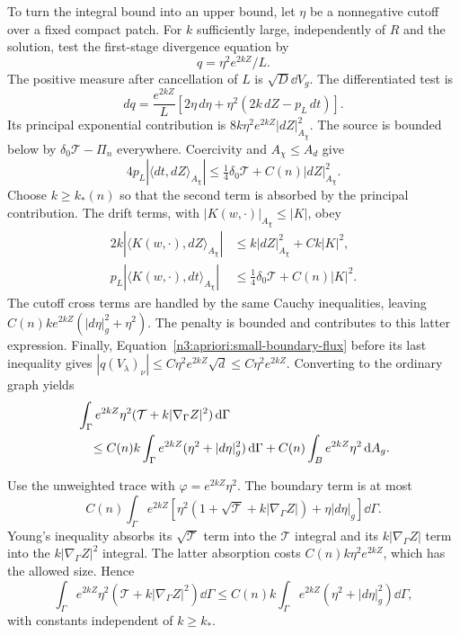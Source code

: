 To turn the integral bound into an upper bound, let $\eta$ be a
nonnegative cutoff over a fixed compact patch.  For $k$ sufficiently
large, independently of $R$ and the solution, test the first-stage
divergence equation by
\[
 q=\eta^2e^{2kZ}/L.
\]
The positive measure after cancellation of $L$ is
$\sqrt D\dd V_g$.  The differentiated test is
\[
 dq=\frac{e^{2kZ}}L
       [2\eta\,d\eta+\eta^2(2k\,dZ-p_L\,dt)].
\]
Its principal exponential contribution is
$8k\eta^2e^{2kZ}|dZ|_{A_\chi}^2$.  The source is bounded below
by $\delta_0\mathcal T-\Pi_n$ everywhere.
Coercivity and $A_\chi\le A_d$ give
\[
 4p_L|\langle dt,dZ\rangle_{A_\chi}|
 \le\tfrac14\delta_0\mathcal T+C(n)|dZ|_{A_\chi}^2.
\]
Choose $k\ge k_*(n)$ so that the second term is absorbed by the
principal contribution.  The drift terms, with $|K(w,\cdot)|_{A_\chi}
\le |K|$, obey
\begin{align*}
 2k|\langle K(w,\cdot),dZ\rangle_{A_\chi}|
   &\le k|dZ|_{A_\chi}^2+Ck|K|^2,\\
 p_L|\langle K(w,\cdot),dt\rangle_{A_\chi}|
   &\le\tfrac14\delta_0\mathcal T+C(n)|K|^2.
\end{align*}
The cutoff cross terms are handled by the same Cauchy inequalities,
leaving $C(n)k e^{2kZ}(|d\eta|_g^2+\eta^2)$.
The penalty is bounded and contributes to this latter expression.
Finally, Equation~\eqref{n3:apriori:small-boundary-flux} before its last
inequality gives
$|q(V_\lambda)_\nu|\le C\eta^2e^{2kZ}\sqrt d
\le C\eta^2e^{2kZ}$.
Converting to the ordinary graph yields
\begin{align}
 &\int_\Gamma e^{2kZ}\eta^2
       (\mathcal T+k|\nabla_\Gamma Z|^2)\,\mathrm d\Gamma\notag\\
 &\quad\le C(n)k\int_\Gamma e^{2kZ}
                (\eta^2+|d\eta|_g^2)\,\mathrm d\Gamma
               +C(n)\int_B e^{2kZ}\eta^2\,\mathrm d A_g.
 \label{n3:apriori:iteration-energy-boundary}
\end{align}

Use the unweighted trace with $\varphi=e^{2kZ}\eta^2$.  The boundary
term is at most
\[
 C(n)\int_\Gamma e^{2kZ}
   \left[\eta^2(1+\sqrt{\mathcal T}
                   +k|\nabla_\Gamma Z|)+\eta|d\eta|_g\right]
                                                   \dd\Gamma.
\]
Young's inequality absorbs its $\sqrt{\mathcal T}$ term into the
$\mathcal T$ integral and its $k|\nabla_\Gamma Z|$ term into the
$k|\nabla_\Gamma Z|^2$ integral.  The latter absorption costs
$C(n)k\eta^2e^{2kZ}$, which has the allowed size.  Hence
\begin{equation}
 \int_\Gamma e^{2kZ}\eta^2
       (\mathcal T+k|\nabla_\Gamma Z|^2)\dd\Gamma
 \le C(n)k\int_\Gamma e^{2kZ}
                   (\eta^2+|d\eta|_g^2)\dd\Gamma,
 \label{n3:apriori:iteration-energy}
\end{equation}
with constants independent of $k\ge k_*$.

